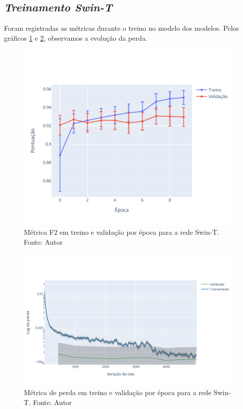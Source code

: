 \subsection{\textit{Treinamento Swin-T}}\label{sec:Cap3_TrainSwinT}

Foram registradas as métricas durante o treino no modelo dos modelos. Pelos gráficos \ref{fig:PontuacaoTrainSwin} e \ref{fig:LossTrainSwin}, observamos a evolução da perda.

\begin{figure}[!ht]
    \centering
    \includegraphics[width=\columnwidth]{Imagens/results/rsp-swin-t_planet_pt/pontuação em treino e validação por época.pdf}
    \caption{ Métrica F2 em treino e validação por época para a rede Swin-T. Fonte: Autor}
    \label{fig:PontuacaoTrainSwin}
\end{figure}  

\begin{figure}[!ht]
    \centering
    \includegraphics[width=\columnwidth]{Imagens/results/rsp-swin-t_planet_pt/Training Loss Per Minibatch.pdf}
    \caption{ Métrica de perda em treino e validação por época para a rede Swin-T. Fonte: Autor}
    \label{fig:LossTrainSwin}
\end{figure}


